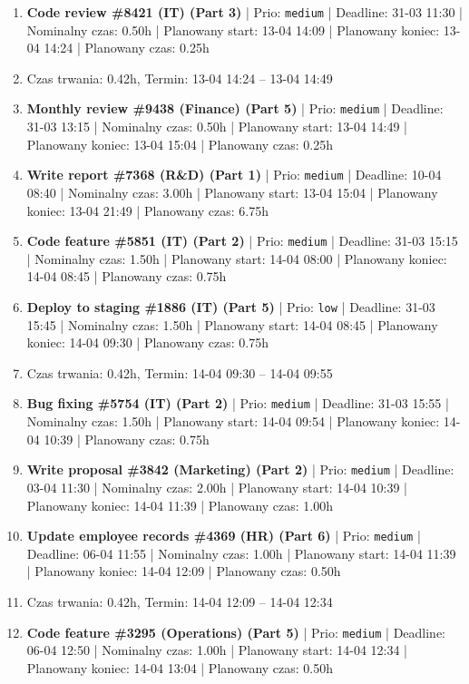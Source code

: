 {\begin{enumerate}
  \item [\textbf{14665}] \textbf{Code review \#8421 (IT) (Part 3)} | Prio: \texttt{medium} | Deadline: 31-03 11:30 | Nominalny czas: 0.50h | Planowany start: 13-04 14:09 | Planowany koniec: 13-04 14:24 | Planowany czas: 0.25h
  \item [\textbf{PRZERWA}] Czas trwania: 0.42h, Termin: 13-04 14:24 -- 13-04 14:49
  \item [\textbf{14656}] \textbf{Monthly review \#9438 (Finance) (Part 5)} | Prio: \texttt{medium} | Deadline: 31-03 13:15 | Nominalny czas: 0.50h | Planowany start: 13-04 14:49 | Planowany koniec: 13-04 15:04 | Planowany czas: 0.25h
  \item [\textbf{14633}] \textbf{Write report \#7368 (R\&D) (Part 1)} | Prio: \texttt{medium} | Deadline: 10-04 08:40 | Nominalny czas: 3.00h | Planowany start: 13-04 15:04 | Planowany koniec: 13-04 21:49 | Planowany czas: 6.75h
  \item [\textbf{14643}] \textbf{Code feature \#5851 (IT) (Part 2)} | Prio: \texttt{medium} | Deadline: 31-03 15:15 | Nominalny czas: 1.50h | Planowany start: 14-04 08:00 | Planowany koniec: 14-04 08:45 | Planowany czas: 0.75h
  \item [\textbf{14697}] \textbf{Deploy to staging \#1886 (IT) (Part 5)} | Prio: \texttt{low} | Deadline: 31-03 15:45 | Nominalny czas: 1.50h | Planowany start: 14-04 08:45 | Planowany koniec: 14-04 09:30 | Planowany czas: 0.75h
  \item [\textbf{PRZERWA}] Czas trwania: 0.42h, Termin: 14-04 09:30 -- 14-04 09:55
  \item [\textbf{14631}] \textbf{Bug fixing \#5754 (IT) (Part 2)} | Prio: \texttt{medium} | Deadline: 31-03 15:55 | Nominalny czas: 1.50h | Planowany start: 14-04 09:54 | Planowany koniec: 14-04 10:39 | Planowany czas: 0.75h
  \item [\textbf{14673}] \textbf{Write proposal \#3842 (Marketing) (Part 2)} | Prio: \texttt{medium} | Deadline: 03-04 11:30 | Nominalny czas: 2.00h | Planowany start: 14-04 10:39 | Planowany koniec: 14-04 11:39 | Planowany czas: 1.00h
  \item [\textbf{14658}] \textbf{Update employee records \#4369 (HR) (Part 6)} | Prio: \texttt{medium} | Deadline: 06-04 11:55 | Nominalny czas: 1.00h | Planowany start: 14-04 11:39 | Planowany koniec: 14-04 12:09 | Planowany czas: 0.50h
  \item [\textbf{PRZERWA}] Czas trwania: 0.42h, Termin: 14-04 12:09 -- 14-04 12:34
  \item [\textbf{14645}] \textbf{Code feature \#3295 (Operations) (Part 5)} | Prio: \texttt{medium} | Deadline: 06-04 12:50 | Nominalny czas: 1.00h | Planowany start: 14-04 12:34 | Planowany koniec: 14-04 13:04 | Planowany czas: 0.50h

\end{enumerate}}
